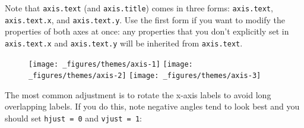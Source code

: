 Note that \texttt{axis.text} (and \texttt{axis.title}) comes in three
forms: \texttt{axis.text}, \texttt{axis.text.x}, and
\texttt{axis.text.y}. Use the first form if you want to modify the
properties of both axes at once: any properties that you don't
explicitly set in \texttt{axis.text.x} and \texttt{axis.text.y} will be
inherited from \texttt{axis.text}.

\begin{Shaded}
\begin{Highlighting}[]
\StringTok{ }\NormalTok{(} \NormalTok{:}\NormalTok{, } \NormalTok{:}\NormalTok{)}
\StringTok{ }\StringTok{ }\NormalTok{()}

\StringTok{ }\NormalTok{(} \NormalTok{(} \NormalTok{, } \NormalTok{))}
\StringTok{ }\NormalTok{(} \NormalTok{(} \NormalTok{, } \NormalTok{))}
\StringTok{ }\NormalTok{(} \NormalTok{(} \NormalTok{-}\NormalTok{, } \NormalTok{))}
\end{Highlighting}
\end{Shaded}

\begin{figure}[H]
  \texttt{[image: \_figures/themes/axis-1]}%
  \texttt{[image: \_figures/themes/axis-2]}%
  \texttt{[image: \_figures/themes/axis-3]}
\end{figure}

The most common adjustment is to rotate the x-axis labels to avoid long
overlapping labels. If you do this, note negative angles tend to look
best and you should set \texttt{hjust\ =\ 0} and \texttt{vjust\ =\ 1}:

